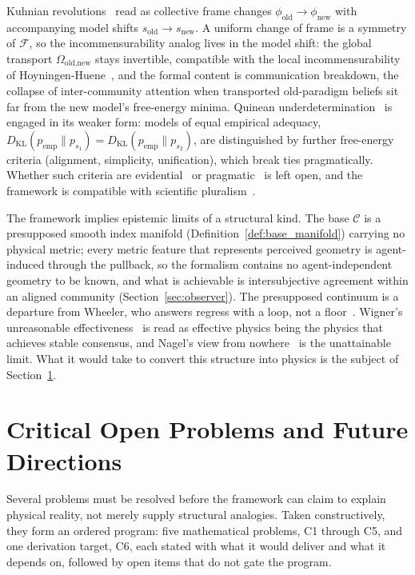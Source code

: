 Kuhnian revolutions~\cite{Kuhn1962} read as collective frame changes $\phi_{\text{old}} \to \phi_{\text{new}}$ with accompanying model shifts $s_{\text{old}} \to s_{\text{new}}$. A uniform change of frame is a symmetry of $\mathcal{F}$, so the incommensurability analog lives in the model shift: the global transport $\Omega_{\text{old,new}}$ stays invertible, compatible with the local incommensurability of Hoyningen-Huene~\cite{Hoyningen-Huene1993}, and the formal content is communication breakdown, the collapse of inter-community attention when transported old-paradigm beliefs sit far from the new model's free-energy minima. Quinean underdetermination~\cite{Quine1951, Quine1975} is engaged in its weaker form: models of equal empirical adequacy, $D_{\mathrm{KL}}(p_{\mathrm{emp}} \| p_{s_1}) = D_{\mathrm{KL}}(p_{\mathrm{emp}} \| p_{s_2})$, are distinguished by further free-energy criteria (alignment, simplicity, unification), which break ties pragmatically. Whether such criteria are evidential~\cite{LaudanLeplin1991} or pragmatic~\cite{vanFraassen1980} is left open, and the framework is compatible with scientific pluralism~\cite{Longino2002}.

The framework implies epistemic limits of a structural kind. The base $\mathcal{C}$ is a presupposed smooth index manifold (Definition~\ref{def:base_manifold}) carrying no physical metric; every metric feature that represents perceived geometry is agent-induced through the pullback, so the formalism contains no agent-independent geometry to be known, and what is achievable is intersubjective agreement within an aligned community (Section~\ref{sec:observer}). The presupposed continuum is a departure from Wheeler, who answers regress with a loop, not a floor~\cite{Wheeler1990}. Wigner's unreasonable effectiveness~\cite{Wigner1960} is read as effective physics being the physics that achieves stable consensus, and Nagel's view from nowhere~\cite{Nagel1986} is the unattainable limit. What it would take to convert this structure into physics is the subject of Section~\ref{sec:open_problems}.

\section{Critical Open Problems and Future Directions}\label{sec:open_problems}

Several problems must be resolved before the framework can claim to explain physical reality, not merely supply structural analogies. Taken constructively, they form an ordered program: five mathematical problems, C1 through C5, and one derivation target, C6, each stated with what it would deliver and what it depends on, followed by open items that do not gate the program.

